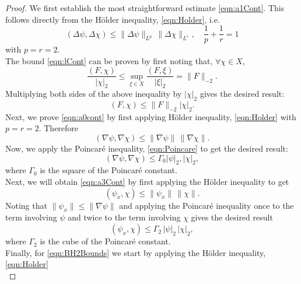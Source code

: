 \begin{proof}
  We first establish the most straightforward estimate \eqref{eqn:a1Cont}. This
  follows directly from the H\"older inequality, \eqref{eqn:Holder}, i.e.
  \begin{equation*}
    (\Delta \psi, \Delta \chi) \le \|\Delta \psi\|_{L^p}\,\|\Delta \chi\|_{L^r},
    \quad \frac{1}{p} + \frac{1}{r} = 1
  \end{equation*}
  with $p=r=2$. \\
  The bound \eqref{eqn:lCont} can be proven by first noting that, $\forall \chi
  \in X$,
  \begin{equation*}
    \frac{(F,\chi)}{|\chi|_2} \le \sup_{\xi \in X} \frac{(F,\xi)}{|\xi|_2} =
      \|F\|_{-2}.
  \end{equation*}
  Multiplying both sides of the above inequality by $|\chi|_2$ gives the desired
  result:
  \begin{equation*}
    (F,\chi) \le \|F\|_{-2}|\chi|_2.
  \end{equation*}
  Next, we prove \eqref{eqn:a0cont} by first applying H\"older inequality, \eqref{eqn:Holder} with
  $p=r=2$. Therefore
  \begin{equation*}
    (\nabla \psi, \nabla \chi) \le \|\nabla \psi\|\, \|\nabla \chi\|.
  \end{equation*}
  Now, we apply the Poincar\'e inequality, \eqref{eqn:Poincare} to get the
  desired result:
  \begin{equation*}
    (\nabla \psi, \nabla \chi) \le \Gamma_0 |\psi|_2, |\chi|_2,
  \end{equation*}
  where $\Gamma_0$ is the square of the Poincar\'e constant. \\
  Next, we will obtain \eqref{eqn:a3Cont} by first applying the H\"older
  inequality to get
  \begin{equation*}
    (\psi_x, \chi) \le \|\psi_x\|\, \|\chi\|.
  \end{equation*}
  Noting that $\|\psi_x\| \le \|\nabla \psi\|$ and applying the Poincar\'e
  inequality once to the term involving $\psi$ and twice to the term involving
  $\chi$ gives the desired result
  \begin{equation*}
    (\psi_x, \chi) \le \Gamma_2\,|\psi|_2\, |\chi|_2,
  \end{equation*}
  where $\Gamma_2$ is the cube of the Poincar\'e constant. \\
  Finally, for \eqref{eqn:BH2Bounds} we start by applying the H\"older inequality, \eqref{eqn:Holder}
  \begin{equation}

\end{equation}
\end{proof}
